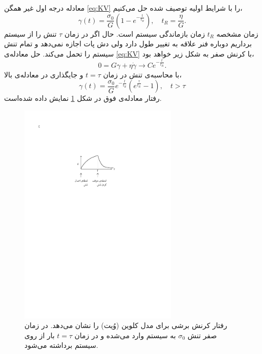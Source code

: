 معادله درجه اول غیر همگن \ref{eq:KV} را با شرایط اولیه توصیف شده حل می‌کنیم،
\begin{equation}
\gamma(t)=\frac{\sigma_0}{G}\left(1-e^{-\frac{t}{t_R}}\right), \quad t_R=\frac{\eta}{G}.
\end{equation}
زمان مشخصه $t_R$ زمان بازماندگی سیستم است. حال اگر در زمان $\tau$ تنش را از سیستم برداریم دوباره فنر علاقه به تغییر طول دارد ولی دش پات اجازه نمی‌دهد و تمام تنش سیستم را تحمل می‌کند. حل معادله‌ی \ref{eq:KV} با کرنش صفر به شکل زیر خواهد بود،
\begin{equation}
0=G\gamma+\eta\dot\gamma \rightarrow Ce^{-\frac{t}{t_R}}.
\end{equation}
با محاسبه‌ی تنش در زمان $t=\tau$ و جایگذاری در معادله‌ی بالا،
\begin{equation}
\gamma(t)=\frac{\sigma_0}{G}e^{-\frac{t}{t_R}}\left(e^{\frac{\tau}{t_R}}-1\right), \quad t>\tau
\end{equation}
رفتار معادله‌ی فوق در شکل \ref{fig:creep_KV} نمایش داده شده‌است.
\begin{figure}[htbp]
\begin{center}
\includegraphics[width=3in]{Figs/creep_KV}
\caption{
رفتار کرنش برشی برای مدل کلوین (وُیت) را نشان می‌دهد. در زمان صفر تنش $\sigma_0$ به سیستم وارد می‌شده و در زمان $t=\tau$ بار از روی سیستم برداشته می‌شود.
}
\label{fig:creep_KV}
\end{center}
\end{figure}
